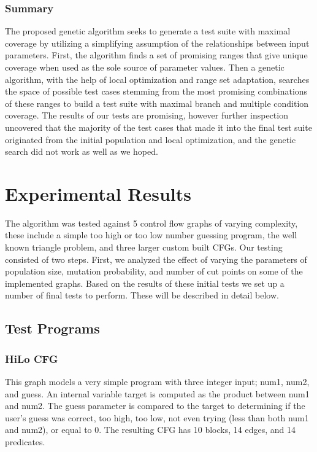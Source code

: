 \documentclass[runningheads]{llncs}
\begin{document}
\subsubsection{Summary}
The proposed genetic algorithm seeks to generate a test suite with maximal coverage by utilizing a simplifying assumption of the relationships between input parameters. First, the algorithm finds a set of promising ranges that give unique coverage when used as the sole source of parameter values. Then a genetic algorithm, with the help of local optimization and range set adaptation, searches the space of possible test cases stemming from the most promising combinations of these ranges to build a test suite with maximal branch and multiple condition coverage. The results of our tests are promising, however further inspection uncovered that the majority of the test cases that made it into the final test suite originated from the initial population and local optimization, and the genetic search did not work as well as we hoped. 

\section{Experimental Results}

The algorithm was tested against 5 control flow graphs of varying complexity, these include a simple too high or too low number guessing program, the well known triangle problem, and three larger custom built CFGs. Our testing consisted of two steps. First, we analyzed the effect of varying the parameters of population size, mutation probability, and number of cut points on some of the implemented graphs. Based on the results of these initial tests we set up a number of final tests to perform. These will be described in detail below. 
  
\subsection{Test Programs}

\subsubsection{HiLo CFG}
This graph models a very simple program with three integer input; num1, num2, and guess. An internal variable target is computed as the product between num1 and num2. The guess parameter is compared to the target to determining if the user's guess was correct, too high, too low, not even trying (less than both num1 and num2), or equal to 0. The resulting CFG has 10 blocks, 14 edges, and 14 predicates.
\end{document}
